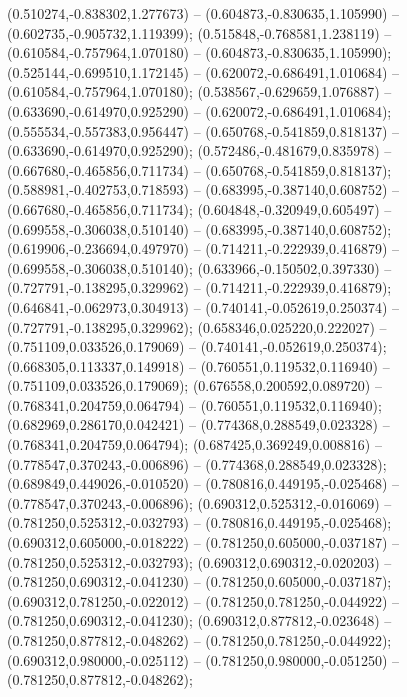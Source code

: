  (0.510274,-0.838302,1.277673) -- (0.604873,-0.830635,1.105990) -- (0.602735,-0.905732,1.119399);
 (0.515848,-0.768581,1.238119) -- (0.610584,-0.757964,1.070180) -- (0.604873,-0.830635,1.105990);
 (0.525144,-0.699510,1.172145) -- (0.620072,-0.686491,1.010684) -- (0.610584,-0.757964,1.070180);
 (0.538567,-0.629659,1.076887) -- (0.633690,-0.614970,0.925290) -- (0.620072,-0.686491,1.010684);
 (0.555534,-0.557383,0.956447) -- (0.650768,-0.541859,0.818137) -- (0.633690,-0.614970,0.925290);
 (0.572486,-0.481679,0.835978) -- (0.667680,-0.465856,0.711734) -- (0.650768,-0.541859,0.818137);
 (0.588981,-0.402753,0.718593) -- (0.683995,-0.387140,0.608752) -- (0.667680,-0.465856,0.711734);
 (0.604848,-0.320949,0.605497) -- (0.699558,-0.306038,0.510140) -- (0.683995,-0.387140,0.608752);
 (0.619906,-0.236694,0.497970) -- (0.714211,-0.222939,0.416879) -- (0.699558,-0.306038,0.510140);
 (0.633966,-0.150502,0.397330) -- (0.727791,-0.138295,0.329962) -- (0.714211,-0.222939,0.416879);
 (0.646841,-0.062973,0.304913) -- (0.740141,-0.052619,0.250374) -- (0.727791,-0.138295,0.329962);
 (0.658346,0.025220,0.222027) -- (0.751109,0.033526,0.179069) -- (0.740141,-0.052619,0.250374);
 (0.668305,0.113337,0.149918) -- (0.760551,0.119532,0.116940) -- (0.751109,0.033526,0.179069);
 (0.676558,0.200592,0.089720) -- (0.768341,0.204759,0.064794) -- (0.760551,0.119532,0.116940);
 (0.682969,0.286170,0.042421) -- (0.774368,0.288549,0.023328) -- (0.768341,0.204759,0.064794);
 (0.687425,0.369249,0.008816) -- (0.778547,0.370243,-0.006896) -- (0.774368,0.288549,0.023328);
 (0.689849,0.449026,-0.010520) -- (0.780816,0.449195,-0.025468) -- (0.778547,0.370243,-0.006896);
 (0.690312,0.525312,-0.016069) -- (0.781250,0.525312,-0.032793) -- (0.780816,0.449195,-0.025468);
 (0.690312,0.605000,-0.018222) -- (0.781250,0.605000,-0.037187) -- (0.781250,0.525312,-0.032793);
 (0.690312,0.690312,-0.020203) -- (0.781250,0.690312,-0.041230) -- (0.781250,0.605000,-0.037187);
 (0.690312,0.781250,-0.022012) -- (0.781250,0.781250,-0.044922) -- (0.781250,0.690312,-0.041230);
 (0.690312,0.877812,-0.023648) -- (0.781250,0.877812,-0.048262) -- (0.781250,0.781250,-0.044922);
 (0.690312,0.980000,-0.025112) -- (0.781250,0.980000,-0.051250) -- (0.781250,0.877812,-0.048262);
